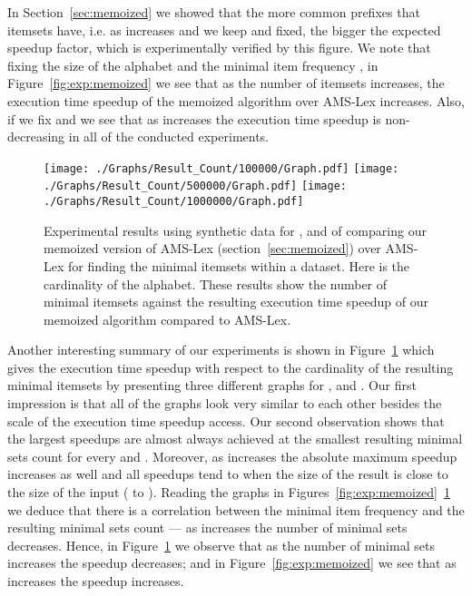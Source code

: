 \documentclass[13pt,a4paper]{article}
\begin{document}
In Section~\ref{sec:memoized} we showed that the more common prefixes that itemsets have, i.e. as  increases and we keep  and  fixed, the bigger the expected speedup factor, which is experimentally verified by this figure. We note that fixing the size of the alphabet  and the minimal item frequency , in Figure~\ref{fig:exp:memoized} we see that as the number of itemsets  increases, the execution time speedup of the memoized algorithm over AMS-Lex increases. Also, if we fix  and  we see that as  increases the execution time speedup is non-decreasing in all of the conducted experiments.

\begin{figure} [t]
	\centering
	\texttt{[image: ./Graphs/Result\_Count/100000/Graph.pdf]}
	\texttt{[image: ./Graphs/Result\_Count/500000/Graph.pdf]}
	\texttt{[image: ./Graphs/Result\_Count/1000000/Graph.pdf]}
	\caption{Experimental results using synthetic data for ,  and  of comparing our memoized version of AMS-Lex (section~\ref{sec:memoized}) over AMS-Lex for finding the minimal itemsets within a dataset. Here  is the cardinality of the alphabet. These results show the number of minimal itemsets against the resulting execution time speedup of our memoized algorithm compared to AMS-Lex.}
	\label{fig:exp:memoized:res_count}
\end{figure}

Another interesting summary of our experiments is shown in Figure~\ref{fig:exp:memoized:res_count} which gives the execution time speedup with respect to the cardinality of the resulting minimal itemsets by presenting three different graphs for ,  and . Our first impression is that all of the graphs look very similar to each other besides the scale of the execution time speedup access. Our second observation shows that the largest speedups are almost always achieved at the smallest resulting minimal sets count for every  and . Moreover, as  increases the absolute maximum speedup increases as well and all speedups tend to  when the size of the result is close to the size of the input ( to ). Reading the graphs in Figures~\ref{fig:exp:memoized}~\ref{fig:exp:memoized:res_count} we deduce that there is a correlation between the minimal item frequency  and the resulting minimal sets count --- as  increases the number of minimal sets decreases. Hence, in Figure~\ref{fig:exp:memoized:res_count} we observe that as the number of minimal sets increases the speedup decreases; and in Figure~\ref{fig:exp:memoized} we see that as  increases the speedup increases.
\end{document}
